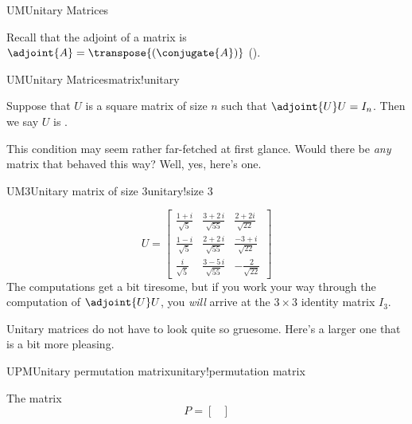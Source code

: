 \begin{subsect}{UM}{Unitary Matrices}
%
\begin{para}Recall that the adjoint of a matrix is $\adjoint{A}=\transpose{\left(\conjugate{A}\right)}$ ().\end{para}
%
\begin{definition}{UM}{Unitary Matrices}{matrix!unitary}
\begin{para}Suppose that $U$ is a square matrix of size $n$ such that $\adjoint{U}U=I_n$.  Then we say $U$ is .\end{para}
\end{definition}
%
\begin{para}This condition may seem rather far-fetched at first glance.  Would there be {\em any} matrix that behaved this way?  Well, yes, here's one.\end{para}
%
\begin{example}{UM3}{Unitary matrix of size 3}{unitary!size 3}
%
\begin{para}\begin{equation*}
U=
\begin{bmatrix}
%
\frac{1 + i }{{\sqrt{5}}} &
   \frac{3 + 2\,i }{{\sqrt{55}}} &
   \frac{2+2i}{\sqrt{22}} \\
%
\frac{1 - i }{{\sqrt{5}}} &
   \frac{2 + 2\,i }{{\sqrt{55}}} &
   \frac{-3 + i }{{\sqrt{22}}} \\
%
\frac{i }{{\sqrt{5}}} &
   \frac{3 - 5\,i }{{\sqrt{55}}} &
   -\frac{2}{\sqrt{22}}
\end{bmatrix}
\end{equation*}
%
The computations get a bit tiresome, but if you work your way through the computation of $\adjoint{U}U$, you {\em will} arrive at the $3\times 3$ identity matrix $I_3$.\end{para}
%
\end{example}
%
%
%
\begin{para}Unitary matrices do not have to look quite so gruesome.  Here's a larger one that is a bit more pleasing.\end{para}
%
\begin{example}{UPM}{Unitary permutation matrix}{unitary!permutation matrix}
\begin{para}The matrix
%
\begin{equation*}
P=
\begin{bmatrix}

\end{bmatrix}
\end{equation*}
\end{para}
\end{example}
\end{subsect}
